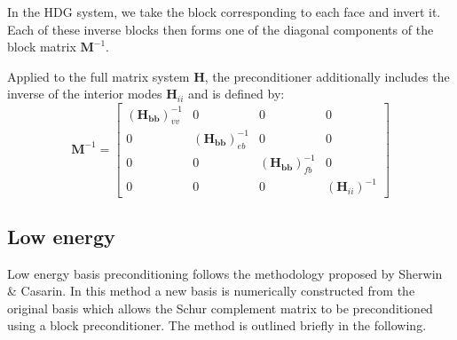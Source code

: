 In the HDG system, we take the block corresponding to each face and invert
it. Each of these inverse blocks then forms one of the diagonal components of
the block matrix $\mathbf{M}^{-1}$.

Applied to the full matrix system $\mathbf{H}$, the preconditioner additionally includes the inverse of the interior modes $\mathbf{H}_{ii}$ and is defined by:
%
\[
\mathbf{M}^{-1}=\left[\begin{array}{cccc}
(\mathbf{H_{bb}})^{-1}_{vv} & 0 & 0 & 0 \\
0 & (\mathbf{H_{bb}})^{-1}_{eb} & 0 & 0 \\
0 & 0 & (\mathbf{H_{bb}})^{-1}_{fb} & 0 \\
0 & 0 & 0 & (\mathbf{H}_{ii})^{-1}
\end{array}\right]
\]
%

\subsection{Low energy}

Low energy basis preconditioning follows the methodology proposed by Sherwin \&
Casarin. In this method a new basis is numerically constructed from the original
basis which allows the Schur complement matrix to be preconditioned using a
block preconditioner. The method is outlined briefly in the following.

